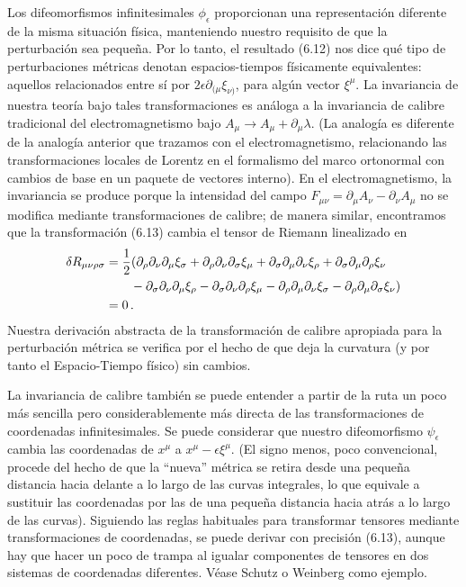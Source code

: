 \documentclass[11pt,b5paper,openany,twoside]{book}
\newcommand{\mn}{{\mu\nu}}
\newcommand{\p}[1]{{\partial_{#1}}}
\begin{document}
Los difeomorfismos infinitesimales $\phi_\epsilon$ proporcionan una representación diferente de la misma situación física, manteniendo nuestro requisito de que la perturbación sea pequeña.
Por lo tanto, el resultado (6.12) nos dice qué tipo de perturbaciones métricas denotan espacios-tiempos físicamente equivalentes: aquellos relacionados entre sí por $2\epsilon\partial_{(\mu}\xi_{\nu)}$, para algún vector $\xi^\mu$.
La invariancia de nuestra teoría bajo tales transformaciones es análoga a la invariancia de calibre tradicional del electromagnetismo bajo $A_\mu \rightarrow A_\mu + \p\mu\lambda$.
(La analogía es diferente de la analogía anterior que trazamos con el electromagnetismo, relacionando las transformaciones locales de Lorentz en el formalismo del marco ortonormal con cambios de base en un paquete de vectores interno).
En el electromagnetismo, la invariancia se produce porque la intensidad del campo $F_\mn = \p\mu A_\nu - \p\nu A_\mu$ no se modifica mediante transformaciones de calibre; de manera similar, encontramos que la transformación (6.13) cambia el tensor de Riemann linealizado en
\begin{align}
\delta R_{\mn\rho\sigma}  &=
{1\over 2}(\p\rho\p\nu\p\mu\xi_\sigma +\p\rho\p\nu\p\sigma\xi_\mu
+ \p\sigma\p\mu\p\nu\xi_\rho + \p\sigma\p\mu\p\rho\xi_\nu  \notag \\
& \qquad - \p\sigma\p\nu\p\mu\xi_\rho - \p\sigma\p\nu\p\rho\xi_\mu
- \p\rho\p\mu\p\nu\xi_\sigma - \p\rho\p\mu\p\sigma\xi_\nu ) \notag \\
&= 0\,. \label{6.14}
\end{align}
Nuestra derivación abstracta de la transformación de calibre apropiada para la perturbación métrica se verifica por el hecho de que deja la curvatura (y por tanto el Espacio-Tiempo físico) sin cambios.

La invariancia de calibre también se puede entender a partir de la ruta un poco más sencilla pero considerablemente más directa de las transformaciones de coordenadas infinitesimales.
Se puede considerar que nuestro difeomorfismo $\psi_\epsilon$ cambia las coordenadas de $x^\mu$ a $x^\mu -\epsilon\xi^\mu$.
(El signo menos, poco convencional, procede del hecho de que la ``nueva'' métrica se retira desde una pequeña distancia hacia delante a lo largo de las curvas integrales, lo que equivale a sustituir las coordenadas por las de una pequeña distancia hacia atrás a lo largo de las curvas).
Siguiendo las reglas habituales para transformar tensores mediante transformaciones de coordenadas, se puede derivar con precisión (6.13), aunque hay que hacer un poco de trampa al igualar componentes de tensores en dos sistemas de coordenadas diferentes.
Véase Schutz o Weinberg como ejemplo.
\end{document}
